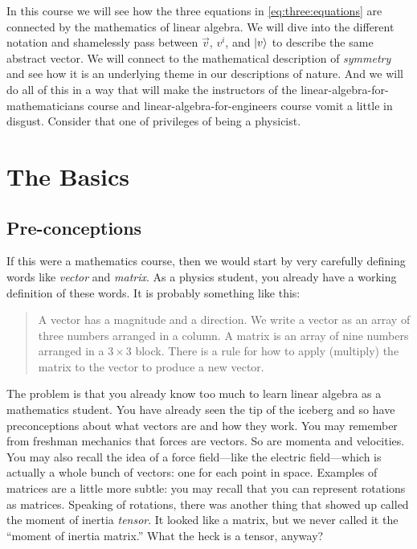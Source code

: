 \documentclass[12pt, oneside]{report}    %
\let\oldsection\section
\def\section{%
  \setcounter{sidenote}{1}%
  \oldsection
}
\begin{document}
In this course we will see how the three equations in \eqref{eq:three:equations} are connected by the mathematics of linear algebra. We will dive into the different notation and shamelessly pass between $\vec{v}$, $v^i$, and $\left|v\right\rangle$ to describe the same abstract vector. We will connect to the mathematical description of \emph{symmetry} and see how it is an underlying theme in our descriptions of nature. And we will do all of this in a way that will make the instructors of the linear-algebra-for-mathematicians course and linear-algebra-for-engineers course vomit a little in disgust. Consider that one of privileges of being a physicist.



\chapter{The Basics}\label{ch:basics}

\section{Pre-conceptions}

If this were a mathematics course, then we would start by very carefully defining words like \emph{vector} and \emph{matrix}. As a physics student, you already have a working definition of these words. It is probably something like this:
%
\begin{quote}
A vector has a magnitude and a direction. We write a vector as an array of three numbers arranged in a column. A matrix is an array of nine numbers arranged in a $3\times 3$ block. There is a rule for how to apply (multiply) the matrix to the vector to produce a new vector.
\end{quote}

The problem is that you already know too much to learn linear algebra as a mathematics student. You have already seen the tip of the iceberg and so have preconceptions about what vectors are and how they work. You may remember from freshman mechanics that forces are vectors. So are momenta and velocities. You may also recall the idea of a force field---like the electric field---which is actually a whole bunch of vectors: one for each point in space. Examples of matrices are a little more subtle: you may recall that you can represent rotations as matrices. Speaking of rotations, there was another thing that showed up called the moment of inertia \emph{tensor}. It looked like a matrix, but we never called it the ``moment of inertia matrix.'' What the heck is a tensor, anyway?
\end{document}
